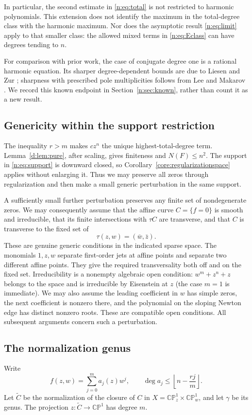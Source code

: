 \documentclass[UTF8,11pt]{ctexart}
\theoremstyle{definition}
\numberwithin{equation}{section}
\newcommand{\CP}{\mathbb {CP}}\newcommand{\cP}{\mathcal P}
\begin{document}
In particular, the second estimate in \eqref{n:eq:total} is not restricted to
harmonic polynomials. This extension does not identify the maximum in the
total-degree class with the harmonic maximum. Nor does the asymptotic result
\eqref{n:eq:limit} apply to that smaller class: the allowed mixed terms in
\eqref{n:eq:Eclass} can have degrees tending to $n$.

For comparison with prior work, the case of conjugate degree one is a
rational harmonic equation. Its sharper degree-dependent bounds are due to
Liesen and Zur \cite[Theorem~1.1, author version v2, p.~2]{LZ18}; sharpness
with prescribed pole multiplicities follows from Lee and Makarov
\cite[Theorem~C, p.~3]{LM14}. We record this known endpoint in
Section~\ref{n:sec:known}, rather than count it as a new result.

\subsection{Genericity within the support restriction}\label{n:sec:reg}
The inequality $r>m$ makes $cz^n$ the unique highest-total-degree term.
Lemma~\ref{d:lem:pure}, after scaling, gives finiteness and $N(F)\le n^2$.
The support in \eqref{n:eq:support} is downward closed, so
Corollary~\ref{core:regularizationspace} applies without enlarging it.
Thus we may preserve all zeros through regularization and then make a
small generic perturbation in the same support.

A sufficiently small further perturbation preserves any finite set of
nondegenerate zeros. We may consequently assume that the affine curve
$C=\{f=0\}$ is smooth and irreducible, that its finite intersections with
$\tau C$ are transverse, and that $C$ is transverse to the fixed set of
\[
 \tau(z,w)=(\bar w,\bar z).
\]
These are genuine generic conditions in the indicated sparse space.
The monomials $1,z,w$ separate first-order jets at affine points and
separate two different affine points. They give the required transversality
both off and on the fixed set. Irreducibility is a nonempty algebraic open
condition: $w^m+z^n+z$ belongs to the space and is irreducible by Eisenstein
at $z$ (the case $m=1$ is immediate). We may also assume the leading
coefficient in $w$ has simple zeros, the next coefficient is nonzero there,
and the polynomial on the sloping Newton edge has distinct nonzero roots.
These are compatible open conditions. All subsequent arguments concern
such a perturbation.

\subsection{The normalization genus}\label{n:sec:genus}
Write
\[
 f(z,w)=\sum_{j=0}^m a_j(z)w^j,
 \qquad \deg a_j\le\left\lfloor n-\frac{rj}{m}\right\rfloor.
\]
Let $\widetilde C$ be the normalization of the closure of $C$ in
$X=\CP^1_z\times\CP^1_w$, and let $\gamma$ be its genus. The projection
$z:\widetilde C\to\CP^1$ has degree $m$.
\end{document}
